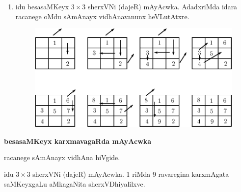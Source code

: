 \begin{enumerate}[{\rm I.}]
\item idu besasaMKeyx $3\times 3$ sherxVNi (dajeR) mAyAcwka. AdadxriMda idara racanege oMdu sAmAnayx vidhAnavanunx heVLutAtxre.
\begin{figure}[H]
\centering
\includegraphics[scale=.8]{src/figures/m_117a.eps}
\end{figure}
\end{enumerate}

{\bf besasaMKeyx karxmavagaRda mAyAcwka}

racanege sAmAnayx vidhAna hiVgide.

idu $3\times 3$ sherxVNi (dajeR) mAyAcwka. {\rm 1} riMda {\rm 9} ravaregina karxmAgata saMKeyxgaLu aMkagaNita sherxVDhiyalilxve.

